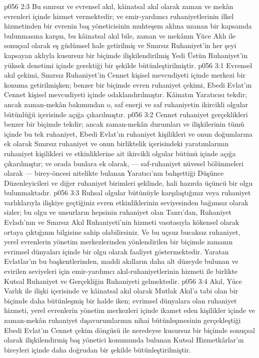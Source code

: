 \vs p056 2:3 Bu sınırsız ve evrensel akıl, kâinatsal akıl olarak zaman ve mekân evrenleri içinde hizmet vermektedir; ve emir\hyp{}yardımcı ruhaniyetlerinin ilkel hizmetinden bir evrenin baş yöneticisinin muhteşem aklına uzanan bir kapsamda bulunmasına karşın, bu kâinatsal akıl bile, zaman ve mekânın Yüce Aklı ile sonuçsal olarak eş güdümsel hale getirilmiş ve Sınırsız Ruhaniyet’in her şeyi kapsayan aklıyla kusursuz bir biçimde ilişkilendirilmiş Yedi Üstün Ruhaniyet’in yüksek denetimi içinde gerektiği bir şekilde bütünleştirilmiştir.
\vs p056 3:1 Evrensel akıl çekimi, Sınırsız Ruhaniyet’in Cennet kişisel mevcudiyeti içinde merkezi bir konuma getirilmişken; benzer bir biçimde evren ruhaniyet çekimi, Ebedi Evlat’ın Cennet kişisel mevcudiyeti içinde odaklandırılmıştır. Kâinatın Yaratıcısı tekdir; ancak zaman\hyp{}mekân bakımından o, saf enerji ve saf ruhaniyetin ikircikli olgular bütünlüğü içerisinde açığa çıkarılmıştır.
\vs p056 3:2 Cennet ruhaniyet gerçeklikleri benzer bir biçimde tekdir; ancak zaman\hyp{}mekân durumları ve ilişkilerinin tümü içinde bu tek ruhaniyet, Ebedi Evlat’ın ruhaniyet kişilikleri ve onun doğumlarına ek olarak Sınırsız ruhaniyet ve onun birliktelik içerisindeki yaratımlarının ruhaniyet kişilikleri ve etkinliklerine ait ikircikli olgular bütünü içinde açığa çıkarılmıştır; ve orada bunlara ek olarak, --- saf\hyp{}ruhaniyet nüvesel bölünmeleri olarak --- birey\hyp{}öncesi nitelikte bulanan Yaratıcı’nın bahşettiği Düşünce Düzenleyicileri ve diğer ruhaniyet birimleri şeklinde, hali hazırda üçüncü bir olgu bulunmaktadır.
\vs p056 3:3 Ruhsal olgular bütünüyle karşılaştığınız veya ruhaniyet varlıklarıyla ilişkiye geçtiğiniz evren etkinliklerinin seviyesinden bağımsız olarak sizler; bu olgu ve unsurların hepsinin ruhaniyet olan Tanrı’dan, Ruhaniyet Evladı’nın ve Sınırsız Akıl Ruhaniyeti’nin hizmeti vasıtasıyla kökensel olarak ortaya çıktığının bilgisine sahip olabilirsiniz. Ve bu uçsuz bucaksız ruhaniyet, yerel evrenlerin yönetim merkezlerinden yönlendirilen bir biçimde zamanın evrimsel dünyaları içinde bir olgu olarak faaliyet göstermektedir. Yaratan Evlatlar’ın bu başkentlerinden, maddi akılların daha alt düzeyde bulunan ve evirilen seviyeleri için emir\hyp{}yardımcı akıl\hyp{}ruhaniyetlerinin hizmeti ile birlikte Kutsal Ruhaniyet ve Gerçekliğin Ruhaniyeti gelmektedir.
\vs p056 3:4 Akıl, Yüce Varlık ile ilişki içerisinde ve kâinatsal akıl olarak Mutlak Akıl’a tabi olan bir biçimde daha bütünleşmiş bir halde iken; evrimsel dünyalara olan ruhaniyet hizmeti, yerel evrenlerin yönetim merkezleri içinde ikamet eden kişilikler içinde ve zaman\hyp{}mekân ruhaniyet dışavurumlarının nihai bütünleşmesinin gerçekleştiği Ebedi Evlat’ın Cennet çekim döngüsü ile neredeyse kusursuz bir biçimde sonuçsal olarak ilişkilendirmiş baş yönetici konumunda bulunan Kutsal Hizmetkârlar'ın bireyleri içinde daha doğrudan bir şekilde bütünleştirilmiştir.
